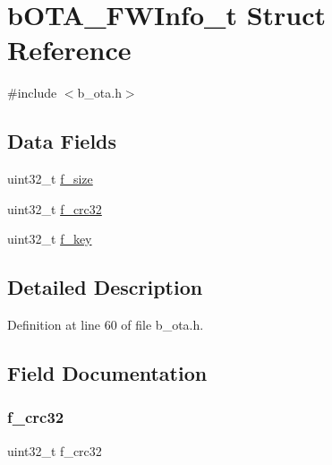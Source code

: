 \hypertarget{structb_o_t_a___f_w_info__t}{}\section{b\+O\+T\+A\+\_\+\+F\+W\+Info\+\_\+t Struct Reference}
\label{structb_o_t_a___f_w_info__t}


{\ttfamily \#include $<$b\+\_\+ota.\+h$>$}

\subsection*{Data Fields}
\begin{DoxyCompactItemize}
\item 
uint32\+\_\+t \mbox{\hyperlink{structb_o_t_a___f_w_info__t_a2ca16b35ded07b71a04f638169e07719}{f\+\_\+size}}
\item 
uint32\+\_\+t \mbox{\hyperlink{structb_o_t_a___f_w_info__t_a4bceb1a193c0bebe178c870c978f3966}{f\+\_\+crc32}}
\item 
uint32\+\_\+t \mbox{\hyperlink{structb_o_t_a___f_w_info__t_a3835e475bd5101f82d3f66e02a3cee73}{f\+\_\+key}}
\end{DoxyCompactItemize}


\subsection{Detailed Description}


Definition at line 60 of file b\+\_\+ota.\+h.



\subsection{Field Documentation}
\mbox{\label{structb_o_t_a___f_w_info__t_a4bceb1a193c0bebe178c870c978f3966}} 
\subsubsection{\texorpdfstring{f\+\_\+crc32}{f\_crc32}}
{\footnotesize\ttfamily uint32\+\_\+t f\+\_\+crc32}



